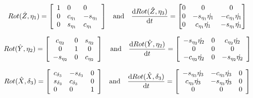 \begin{equation}
    {R o t({\hat{Z}},\eta_1)}={\left[\begin{array}{l l l}{1}&{0}&{0}\\ {0}&{c_{\eta_1}}&{-s_{\eta_1}}\\ {0}&{s_{\eta_1}}&{c_{\eta_1}}\end{array}\right]} \quad \text{and} \quad \frac{\mathrm{d}Rot(\hat{Z}, \eta_3)}{\mathrm{d}t}  = \begin{bmatrix} 0 & 0 & 0 \\ 0 & -s_{\eta_1} \dot{\eta_1} & -c_{\eta_1} \dot{\eta_1} \\ 0 & c_{\eta_1} \dot{\eta_1} & -s_{\eta_1} \dot{\eta_1} \end{bmatrix}
    \label{eq:rotatio_zz}
\end{equation}

\begin{equation}
    Rot(\hat{Y},\eta_2)=\left[\begin{array}{c c c}{{c_{\eta_2}}}&{{0}}&{{s_{\eta_2}}}\\ {{0}}&{{1}}&{{0}}\\ {{-s_{\eta_2}}}&{{0}}&{{c_{\eta_2}}}\end{array}\right] \quad \text{and} \quad \frac{\mathrm{d}Rot(\hat{Y}, \eta_2)}{\mathrm{d}t} = \left[\begin{array}{c c c}-s_{\eta_2} \dot{\eta_2} & 0 & c_{\eta_2} \dot{\eta_2} \\ 0 & 0 & 0 \\ -c_{\eta_2} \dot{\eta_2} & 0 & -s_{\eta_2} \dot{\eta_2} \end{array}\right]
    \label{eq:rotatio_yy}
\end{equation}

\begin{equation}
    Rot({\hat{ X}},{\delta_3})={\left[\begin{array}{l l l}{{{c}_{\delta_3}}}&{{-{s}_{\delta_3}}}&{{0}}\\ {{{s}_{\delta_3}}}&{{{c}_{\delta_3}}}&{{0}}\\ {{0}}&{{0}}&{{1}}\end{array}\right]} \quad \text{and} \quad \frac{\mathrm{d}Rot(\hat{X}, \delta_3)}{\mathrm{d}t} = \left[\begin{array}{c c c}
        -s_{\eta_3} \dot{\eta_3} & -c_{\eta_3} \dot{\eta_3} & 0 \\
        c_{\eta_3} \dot{\eta_3} & -s_{\eta_3} \dot{\eta_3} & 0 \\
        0 & 0 & 0
        \end{array}\right]
        \label{eq:rotatio_xx} 
\end{equation}

